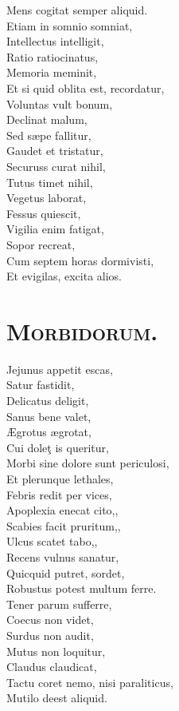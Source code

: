 \documentclass[12pt, twocolumn]{memoir}
\begin{document}
Mens cogitat semper aliquid.\\
Etiam in somnio somniat,\\
Intellectus intelligit,\\
Ratio ratiocinatus,\\
Memoria meminit,\\
Et si quid oblita est, recordatur,\\
Voluntas vult bonum,\\
Declinat malum,\\
Sed sæpe fallitur,\\
Gaudet et tristatur,\\
Securuss curat nihil,\\
Tutus timet nihil,\\
Vegetus laborat,\\
Fessus quiescit,\\
Vigilia enim fatigat,\\
Sopor recreat,\\
Cum septem horas dormivisti,\\
Et evigilas, excita alios.\\

\section*{\textsc{Morbidorum.}}

Jejunus appetit escas,\\
Satur fastidit,\\
Delicatus deligit,\\
Sanus bene valet,\\
Ægrotus ægrotat,\\
Cui doleţ is queritur,\\
Morbi sine dolore sunt periculosi,\\
Et plerunque lethales,\\
Febris redit per vices,\\
Apoplexia enecat cito,,\\
Scabies facit pruritum,,\\
Ulcus scatet tabo,,\\
Recens vulnus sanatur,\\
Quicquid putret, sordet,\\
Robustus potest multum ferre.\\
Tener parum sufferre,\\
Coecus non videt,\\
Surdus non audit,\\
Mutus non loquitur,\\
Claudus claudicat,\\
Tactu coret nemo, nisi paraliticus,\\
Mutilo deest aliquid.\\
\end{document}
